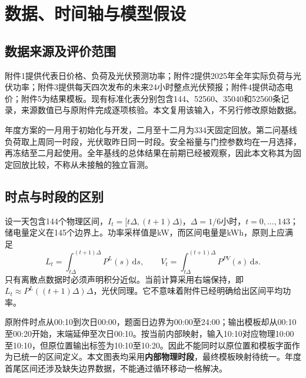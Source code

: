 \documentclass[UTF8,a4paper,zihao=-4,fontset=fandol]{ctexart}
\begin{document}
\section{数据、时间轴与模型假设}
\subsection{数据来源及评价范围}
附件1提供代表日价格、负荷及光伏预测功率；附件2提供2025年全年实际负荷与光伏功率；附件3提供每天四次发布的未来24小时整点光伏预报；附件4提供动态电价；附件5为结果模板\cite{problem}。现有标准化表分别包含144、52560、35040和52560条记录，来源数值已与原附件完成逐项核验。本文复用该输入，不另行修改原始数据。

年度方案的一月用于初始化与开发，二月至十二月为334天固定回放。第二问基线负荷取上周同一时段，光伏取昨日同一时段。安全裕量与门控参数均在一月选择，再冻结至二月起使用。全年基线的总体结果在前期已经被观察，因此本文称其为固定回放比较，不称从未接触的独立盲测。

\subsection{时点与时段的区别}
设一天包含144个物理区间，$I_t=[t\Delta,(t+1)\Delta)$，$\Delta=1/6$小时，$t=0,\ldots,143$；储电量定义在145个边界上。功率采样值是kW，而区间电量是kWh，原则上应满足
\begin{equation}
 L_t=\int_{t\Delta}^{(t+1)\Delta}P^L(s)\,\mathrm ds,\qquad V_t=\int_{t\Delta}^{(t+1)\Delta}P^{PV}(s)\,\mathrm ds.
\end{equation}
只有离散点数据时必须声明积分近似。当前计算采用右端保持，即$L_t\approx P^L((t+1)\Delta)\Delta$，光伏同理。它不意味着附件已经明确给出区间平均功率。

原附件时点从00:10到次日00:00，题面日边界为00:00至24:00；输出模板却从00:10至00:20开始，末端延伸至次日00:10。按当前内部映射，输入10:10对应物理10:00至10:10，但原位置输出标签为10:10至10:20。因此不能同时以原位置和模板字面作为已统一的区间定义。本文图表均采用\textbf{内部物理时段}，最终模板映射待统一。年度首尾区间还涉及缺失边界数据，不能通过循环移动一格解决。
\end{document}
